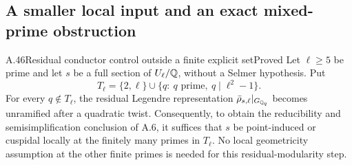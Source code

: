 \subsection{A smaller local input and an exact mixed-prime obstruction}

\begin{statement}{A.46}{Residual conductor control outside a finite explicit set}{Proved}
Let $\ell\ge5$ be prime and let $s$ be a full section of $U_\ell/\mathbb Q$,
without a Selmer hypothesis. Put
\[
 T_\ell=\{2,\ell\}\cup\{q:\ q\text{ prime},\ q\mid\ell^2-1\}.
\]
For every $q\notin T_\ell$, the residual Legendre representation
$\bar\rho_{s,\ell}|_{G_{\mathbb Q_q}}$ becomes unramified after a quadratic twist.
Consequently, to obtain the reducibility and semisimplification conclusion
of A.6, it suffices that $s$ be point-induced or cuspidal locally at the
finitely many primes in $T_\ell$. No local geometricity assumption at
the other finite primes is needed for this residual-modularity step.
\end{statement}
